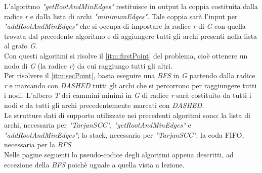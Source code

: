 \documentclass[10pt,a4paper,oneside,article,italian]{memoir}
\theoremstyle{definition}
\begin{document}
L'algoritmo \textit{"getRootAndMinEdges"} restituisce in output la coppia costituita dalla radice \textit{r} e dalla lista di archi \textit{"minimumEdges"}. Tale coppia sarà l'input per \textit{"addRootAndMinEdges"} che si occupa di impostare la radice \textit{r} di \textit{G} con quella trovata dal precedente algoritmo e di aggiungere tutti gli archi presenti nella lista al grafo \textit{G}.\\
Con questi algoritmi si risolve il \cref{itm:firstPoint} del problema, cioè ottenere un nodo di \textit{G} (la radice \textit{r}) da cui raggiungo tutti gli altri.\\
Per risolvere il \cref{itm:secPoint}, basta eseguire una \textit{BFS} in \textit{G} partendo dalla radice \textit{r} e marcando con \textit{DASHED} tutti gli archi che si percorrono per raggiungere tutti i nodi. L'albero \textit{T} dei cammini minimi in \textit{G} di radice \textit{r} sarà costituito da tutti i nodi e da tutti gli archi precedentemente marcati con \textit{DASHED}.\\
Le strutture dati di supporto utilizzate nei precedenti algoritmi sono: la lista di archi, necessaria per \textit{"TarjanSCC"}, \textit{"getRootAndMinEdges"} e \textit{"addRootAndMinEdges"}; lo stack, necessario per \textit{"TarjanSCC"}; la coda FIFO, necessaria per la \textit{BFS}.\\
Nelle pagine seguenti lo pseudo-codice degli algoritmi appena descritti, ad eccezione della \textit{BFS} poichè uguale a quella vista a lezione.
\end{document}
